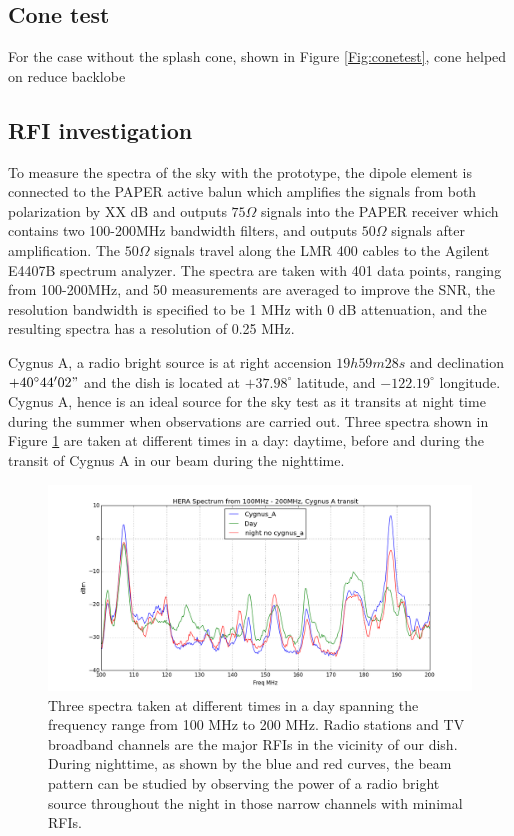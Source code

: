\documentclass[preprint]{aastex}  %
\begin{document}
\subsection{Cone test}


For the case without the splash cone, shown in Figure \ref{Fig:conetest}, cone helped on reduce backlobe

\clearpage
\subsection{RFI investigation}
To measure the spectra of the sky with the prototype, the dipole element is connected to the PAPER active balun which amplifies the signals from both polarization by XX dB and outputs $75\Omega$ signals into the PAPER receiver which contains two 100-200MHz bandwidth filters, and outputs $50\Omega$ signals after amplification. The $50\Omega$ signals travel along the LMR 400 cables to the Agilent E4407B spectrum analyzer. The spectra are taken with 401 data points, ranging from 100-200MHz, and 50 measurements are averaged to improve the SNR, the resolution bandwidth is specified to be 1 MHz with 0 dB attenuation, and the resulting spectra has a resolution of 0.25 MHz.

Cygnus A, a radio bright source is at right accension $19h59m28s$ and declination $+40^\circ44'02"$ and the dish is located at $+37.98^\circ$ latitude, and $-122.19^\circ$ longitude. Cygnus A, hence is an ideal source for the sky test as it transits at night time during the summer when observations are carried out. Three spectra shown in Figure \ref{Fig:RFI} are taken at different times in a day: daytime, before and during the transit of Cygnus A in our beam during the nighttime.

\begin{figure}[H]
	\begin{center}
	\includegraphics[width =.8\textwidth]{spectra_plots/transit,day,night_match-yaxis.png}
	\caption{Three spectra taken at different times in a day spanning the frequency range from 100 MHz to 200 MHz. Radio stations and TV broadband channels are the major RFIs in the vicinity of our dish. During nighttime, as shown by the blue and red curves, the beam pattern can be studied by observing the power of a radio bright source throughout the night in those narrow channels with minimal RFIs.
\label{Fig:RFI}}
	\end{center}
\end{figure}
\end{document}
